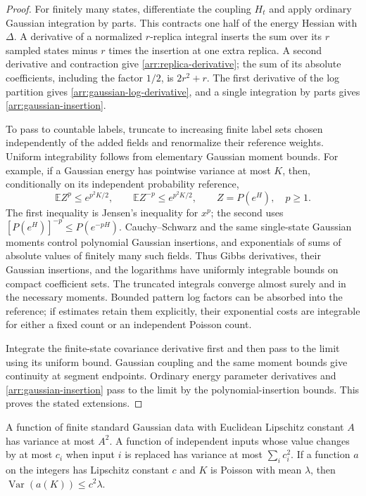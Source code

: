 \begin{proof}
For finitely many states, differentiate the coupling $H_t$ and apply
ordinary Gaussian integration by parts.  This contracts one half of the
energy Hessian with $\Delta$.  A derivative of a normalized $r$-replica
integral inserts the sum over its $r$ sampled states minus $r$ times the
insertion at one extra replica.  A second derivative and contraction
give \eqref{arr:replica-derivative}; the sum of its absolute coefficients,
including the factor $1/2$, is $2r^2+r$.  The first derivative of the log
partition gives \eqref{arr:gaussian-log-derivative}, and a single
integration by parts gives \eqref{arr:gaussian-insertion}.

To pass to countable labels, truncate to increasing finite label sets
chosen independently of the added fields and renormalize their reference
weights.  Uniform integrability follows from elementary Gaussian moment
bounds.  For example, if a Gaussian energy has pointwise variance at most
$K$, then, conditionally on its independent probability reference,
\begin{equation}
 \mathbb E Z^p\leq e^{p^2K/2},\qquad
 \mathbb E Z^{-p}\leq e^{p^2K/2},\qquad
 Z=P(e^H),\quad p\geq1.
 \label{arr:partition-moments}
\end{equation}
The first inequality is Jensen's inequality for $x^p$; the second uses
$[P(e^H)]^{-p}\leq P(e^{-pH})$.  Cauchy--Schwarz and the same
single-state Gaussian moments control polynomial Gaussian insertions,
and exponentials of sums of absolute values of finitely many such
fields.  Thus Gibbs derivatives, their Gaussian insertions, and the
logarithms have uniformly integrable bounds on compact coefficient sets.
The truncated integrals converge almost surely and in the necessary
moments.  Bounded pattern log factors can be absorbed into the reference;
if estimates retain them explicitly, their exponential costs are
integrable for either a fixed count or an independent Poisson count.

Integrate the finite-state covariance derivative first and then pass to
the limit using its uniform bound.  Gaussian coupling and the same
moment bounds give continuity at segment endpoints.  Ordinary energy
parameter derivatives and \eqref{arr:gaussian-insertion} pass to the
limit by the polynomial-insertion bounds.  This proves the stated
extensions.
\end{proof}

\begin{lemma}
\label{arr:variance}
A function of finite standard Gaussian data with Euclidean Lipschitz
constant $A$ has variance at most $A^2$.  A function of independent
inputs whose value changes by at most $c_i$ when input $i$ is replaced
has variance at most $\sum_i c_i^2$.  If a function $a$ on the integers
has Lipschitz constant $c$ and $K$ is Poisson with mean $\lambda$, then
$\operatorname{Var}(a(K))\leq c^2\lambda$.
\end{lemma}

